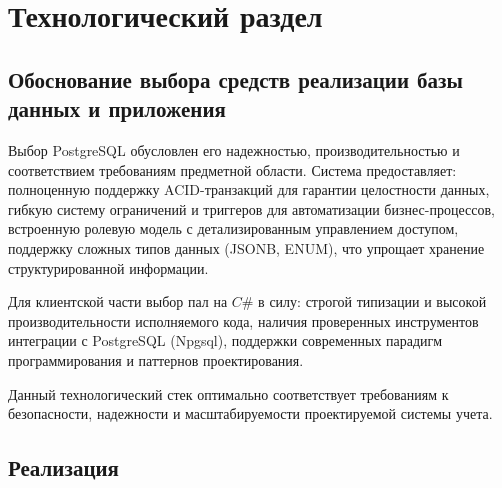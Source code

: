 \chapter{Технологический раздел}
\section{Обоснование выбора средств реализации базы данных и приложения}
Выбор PostgreSQL обусловлен его надежностью, производительностью и соответствием требованиям предметной области. Система предоставляет: полноценную поддержку ACID-транзакций для гарантии целостности данных, гибкую систему ограничений и триггеров для автоматизации бизнес-процессов, встроенную ролевую модель с детализированным управлением доступом, поддержку сложных типов данных (JSONB, ENUM), что упрощает хранение структурированной информации.

Для клиентской части выбор пал на $C\#$ в силу: строгой типизации и высокой производительности исполняемого кода, наличия проверенных инструментов интеграции с PostgreSQL (Npgsql), поддержки современных парадигм программирования и паттернов проектирования.

Данный технологический стек оптимально соответствует требованиям к безопасности, надежности и масштабируемости проектируемой системы учета.
\section{Реализация}
